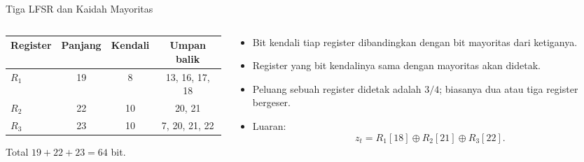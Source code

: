 \documentclass[aspectratio=169,11pt]{beamer}
\begin{document}
\begin{frame}{Tiga LFSR dan Kaidah Mayoritas}
    \footnotesize
    \begin{columns}[T,onlytextwidth]
        \begin{column}{0.50\textwidth}
            \centering
            \scriptsize
            \begin{tabular}{@{}lccc@{}}
                \toprule
                Register & Panjang & Kendali & Umpan balik \\
                \midrule
                $R_1$ & 19 & 8  & 13, 16, 17, 18 \\
                $R_2$ & 22 & 10 & 20, 21 \\
                $R_3$ & 23 & 10 & 7, 20, 21, 22 \\
                \bottomrule
            \end{tabular}
            \vspace{0.1cm}

            Total $19+22+23=64$ bit.
        \end{column}
        \begin{column}{0.46\textwidth}
            \begin{itemize}
                \item Bit kendali tiap register dibandingkan dengan bit
                      mayoritas dari ketiganya.
                \item Register yang bit kendalinya sama dengan mayoritas
                      akan didetak.
                \item Peluang sebuah register didetak adalah $3/4$; biasanya
                      dua atau tiga register bergeser.
                \item Luaran:
                      \[
                          z_t=R_1[18]\oplus R_2[21]\oplus R_3[22].
                      \]
            \end{itemize}
        \end{column}
    \end{columns}
\end{frame}
\end{document}
